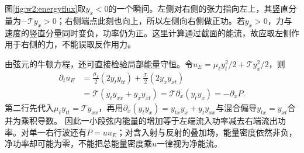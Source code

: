 图\ref{fig:w2:energyflux}取$y_x<0$的一个瞬间。左侧对右侧的张力指向左上，其竖直分量为$-\mathcal T y_x>0$；右侧端点此刻也向上，所以左侧向右侧做正功。若$y_x>0$，力与速度的竖直分量同时变负，功率仍为正。这里计算通过截面的能流，故应取左侧作用于右侧的力，不能误取反作用力。

由弦元的牛顿方程，还可直接检验局部能量守恒。令$u_E=\mu_\ell y_t^2/2+\mathcal T y_x^2/2$，则
\begin{align*}
\partial_tu_E
&=\frac{\mu_\ell}{2}(2y_ty_{tt})+\frac{\mathcal T}{2}(2y_xy_{xt})\\
&=\mathcal T(y_ty_{xx}+y_xy_{xt})
=\mathcal T\partial_x(y_ty_x)=-\partial_xP.
\end{align*}
第二行先代入$\mu_\ell y_{tt}=\mathcal T y_{xx}$，再用$\partial_x(y_ty_x)=y_{tx}y_x+y_ty_{xx}$与混合偏导$y_{tx}=y_{xt}$合并为乘积导数。
因此一小段弦内能量的增加等于左端流入功率减去右端流出功率。对单一右行波还有$P=u u_E$；对含入射与反射的叠加场，能量密度依然非负，净功率却可能为零，不能把总能量密度乘$u$一律视为净能流。

